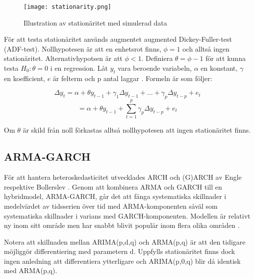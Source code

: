 \documentclass[11pt]{article}
\begin{document}
\begin{figure}[H]
\caption{Illustration av stationäritet med simulerad data}
\texttt{[image: stationarity.png]}
\centering
\end{figure}

För att testa stationäritet används augmentet augmented Dickey-Fuller-test (ADF-test). Nollhypotesen är att en enhetsrot finns, \(\phi=1\) och alltså ingen stationäritet. Alternativhypotsen är att \(\phi<1\). Definiera \(\theta = \phi -1 \) för att kunna testa \(H_0:\theta=0\) i en regression. Låt \(y_t\) vara beroende variabeln, \( \alpha \) en konstant, \( \gamma \) en koefficient, \(e\) är felterm och p antal laggar \parencite{wooldridge2018introductory}. Formeln är som följer:

\begin{equation}
    \Delta y_t = \alpha + \theta y_{t-1} + \gamma_1\Delta y_{t-1} + ... + \gamma_p\Delta y_{t-p} + e_t
\end{equation}
\begin{equation}
        = \alpha + \theta y_{t-1} + \sum_{t=1}^{p}\gamma_p \Delta y_{t-p} + e_t
\end{equation}

Om \(\theta\) är skild från noll förkastas alltså nollhypotesen att ingen stationäritet finns.

\subsection{ARMA-GARCH}

För att hantera heteroskedasticitet utvecklades ARCH och (G)ARCH av Engle \parencite*{engle1982autoregressive} respektive Bollerslev \parencite*{bollerslev1986generalized}. Genom att kombinera ARMA och GARCH till en hybridmodel, ARMA-GARCH, går det att fånga systematiska skillnader i medelvärdet av tidsserien över tid med ARMA-komponenten såväl som systematiska skillnader i varians med GARCH-komponenten. Modellen är relativt ny inom sitt område men har snabbt blivit populär inom flera olika områden \parencite{chen2011short}. 

Notera att skillnaden mellan ARIMA(p,d,q) och ARMA(p,q) är att den tidigare möjliggör differentiering med parametern d. Uppfylls stationäritet finns dock ingen anledning att differentiera ytterligare och ARIMA(p,0,q) blir då identisk med ARMA(p,q). 
\end{document}
